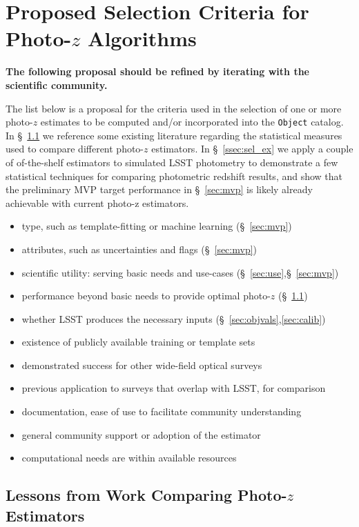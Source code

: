 \documentclass[DM,lsstdraft,toc]{lsstdoc}
\begin{document}
\clearpage
\section{Proposed Selection Criteria for Photo-$z$ Algorithms} \label{sec:sel}

{\bf The following proposal should be refined by iterating with the scientific community.}

The list below is a proposal for the criteria used in the selection of one or more photo-$z$ estimates to be computed and/or incorporated into the {\tt Object} catalog.
In \S~\ref{ssec:sel_lit} we reference some existing literature regarding the statistical measures used to compare different photo-$z$ estimators.
In \S~\ref{ssec:sel_ex} we apply a couple of of-the-shelf estimators to simulated LSST photometry to demonstrate a few statistical techniques for comparing photometric redshift results, and show that the preliminary MVP target performance in \S~\ref{sec:mvp} is likely already achievable with current photo-z estimators.

\begin{itemize}
\item type, such as template-fitting or machine learning (\S~\ref{sec:mvp})
\item attributes, such as uncertainties and flags (\S~\ref{sec:mvp})
\item scientific utility: serving basic needs and use-cases (\S~\ref{sec:use},\S~\ref{sec:mvp})
\item performance beyond basic needs to provide optimal photo-$z$ (\S~\ref{ssec:sel_lit})
\item whether LSST produces the necessary inputs (\S~\ref{sec:objvals},\ref{sec:calib})
\item existence of publicly available training or template sets
\item demonstrated success for other wide-field optical surveys
\item previous application to surveys that overlap with LSST, for comparison
\item documentation, ease of use to facilitate community understanding
\item general community support or adoption of the estimator
\item computational needs are within available resources
\end{itemize}

\subsection{Lessons from Work Comparing Photo-$z$ Estimators}\label{ssec:sel_lit}
\end{document}
